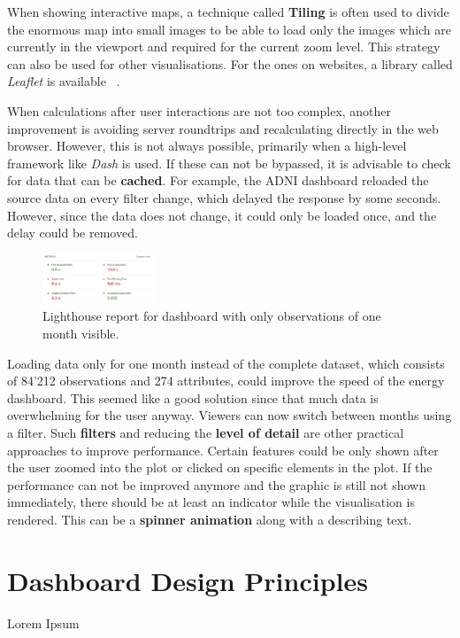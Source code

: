 \documentclass[11pt]{article}
\begin{document}
When showing interactive maps, a technique called \textbf{Tiling} is often used to divide the enormous map into small images to be able to load only the images which are currently in the viewport and required for the current zoom level. This strategy can also be used for other visualisations. For the ones on websites, a library called \textit{Leaflet} is available ~\cite{noauthor_leaflet_2022}.

When calculations after user interactions are not too complex, another improvement is avoiding server roundtrips and recalculating directly in the web browser. However, this is not always possible, primarily when a high-level framework like \textit{Dash} is used. If these can not be bypassed, it is advisable to check for data that can be \textbf{cached}. For example, the ADNI dashboard reloaded the source data on every filter change, which delayed the response by some seconds. However, since the data does not change, it could only be loaded once, and the delay could be removed.

\begin{figure}
    \includegraphics[width=0.3\textwidth]{./lighthouse-2.png}
    \caption{Lighthouse report for dashboard with only observations of one month visible.}
\end{figure}

Loading data only for one month instead of the complete dataset, which consists of 84'212 observations and 274 attributes, could improve the speed of the energy dashboard. This seemed like a good solution since that much data is overwhelming for the user anyway. Viewers can now switch between months using a filter. Such \textbf{filters} and reducing the \textbf{level of detail} are other practical approaches to improve performance. Certain features could be only shown after the user zoomed into the plot or clicked on specific elements in the plot. If the performance can not be improved anymore and the graphic is still not shown immediately, there should be at least an indicator while the visualisation is rendered. This can be a \textbf{spinner animation} along with a describing text.

\pagebreak
\section{Dashboard Design Principles}
Lorem Ipsum
\end{document}
